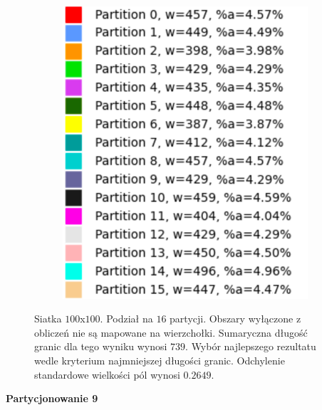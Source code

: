 \begin{figure}[h]
\begin{subfigure}{.33\textwidth}
    \caption[short]{}
\end{subfigure}%
\begin{subfigure}{.33\textwidth}
    \centering
    \includegraphics[width=0.9\linewidth]{images/results/m_k/with/18/results}
    \caption[short]{}
\end{subfigure}
\caption{Siatka $100$x$100$. Podział na $16$ partycji.
Obszary wyłączone z obliczeń nie są mapowane na wierzchołki.
Sumaryczna długość granic dla tego wyniku wynosi $739$.
Wybór najlepszego rezultatu wedle kryterium najmniejszej długości granic.
Odchylenie standardowe wielkości pól wynosi $0.2649$.}
\label{result:18}
\end{figure}

\newpage
\vspace{3mm}
\textbf{Partycjonowanie 9}
\vspace{1mm}


